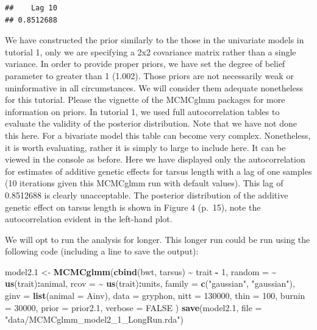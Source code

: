 \documentclass[
  12pt,
]{book}
\newenvironment{Shaded}{\begin{snugshade}}{\end{snugshade}}
\newcommand{\DataTypeTok}[1]{\textcolor[rgb]{0.13,0.29,0.53}{#1}}
\newcommand{\DecValTok}[1]{\textcolor[rgb]{0.00,0.00,0.81}{#1}}
\newcommand{\FloatTok}[1]{\textcolor[rgb]{0.00,0.00,0.81}{#1}}
\newcommand{\KeywordTok}[1]{\textcolor[rgb]{0.13,0.29,0.53}{\textbf{#1}}}
\newcommand{\NormalTok}[1]{#1}
\newcommand{\OperatorTok}[1]{\textcolor[rgb]{0.81,0.36,0.00}{\textbf{#1}}}
\newcommand{\OtherTok}[1]{\textcolor[rgb]{0.56,0.35,0.01}{#1}}
\newcommand{\StringTok}[1]{\textcolor[rgb]{0.31,0.60,0.02}{#1}}
\begin{document}
\begin{verbatim}
##    Lag 10 
## 0.8512688
\end{verbatim}

We have constructed the prior similarly to the those in the univariate models in tutorial 1, only we are specifying a 2x2 covariance matrix rather than a single variance. In order to provide proper priors, we have set the degree of belief parameter to greater than 1 (1.002). Those priors are not necessarily weak or uninformative in all circumstances. We will consider them adequate nonetheless for this tutorial. Please the vignette of the MCMCglmm packages \citep{R-MCMCglmm} for more information on priors. In tutorial 1, we used full autocorrelation tables to evaluate the validity of the posterior distribution. Note that we have not done this here.
For a bivariate model this table can become very complex. Nonetheless, it is worth evaluating, rather it is simply to large to include here. It can be viewed in the console as before. Here we have displayed only the autocorrelation for estimates of additive genetic effects for tarsus length with a lag of one samples (10 iterations given this MCMCglmm run with default values). This lag of 0.8512688 is clearly unacceptable. The posterior distribution of the additive genetic effect on tarsus length is shown in Figure 4 (p.~15), note the autocorrelation evident in the left-hand plot.

We will opt to run the analysis for longer. This longer run could be run using the following code (including a line to save the output):

\begin{Shaded}
\begin{Highlighting}[]
\NormalTok{model2}\FloatTok{.1}\NormalTok{ \textless{}{-}}\StringTok{ }\KeywordTok{MCMCglmm}\NormalTok{(}\KeywordTok{cbind}\NormalTok{(bwt, tarsus) }\OperatorTok{\textasciitilde{}}\StringTok{ }\NormalTok{trait }\OperatorTok{{-}}\StringTok{ }\DecValTok{1}\NormalTok{,}
  \DataTypeTok{random =} \OperatorTok{\textasciitilde{}}\StringTok{ }\KeywordTok{us}\NormalTok{(trait)}\OperatorTok{:}\NormalTok{animal,}
  \DataTypeTok{rcov =} \OperatorTok{\textasciitilde{}}\StringTok{ }\KeywordTok{us}\NormalTok{(trait)}\OperatorTok{:}\NormalTok{units,}
  \DataTypeTok{family =} \KeywordTok{c}\NormalTok{(}\StringTok{"gaussian"}\NormalTok{, }\StringTok{"gaussian"}\NormalTok{),}
  \DataTypeTok{ginv =} \KeywordTok{list}\NormalTok{(}\DataTypeTok{animal =}\NormalTok{ Ainv),}
  \DataTypeTok{data =}\NormalTok{ gryphon,}
  \DataTypeTok{nitt =} \DecValTok{130000}\NormalTok{, }\DataTypeTok{thin =} \DecValTok{100}\NormalTok{, }\DataTypeTok{burnin =} \DecValTok{30000}\NormalTok{,}
  \DataTypeTok{prior =}\NormalTok{ prior2}\FloatTok{.1}\NormalTok{, }\DataTypeTok{verbose =} \OtherTok{FALSE}
\NormalTok{)}
\KeywordTok{save}\NormalTok{(model2}\FloatTok{.1}\NormalTok{, }\DataTypeTok{file =} \StringTok{"data/MCMCglmm\_model2\_1\_LongRun.rda"}\NormalTok{)}
\end{Highlighting}
\end{Shaded}
\end{document}
